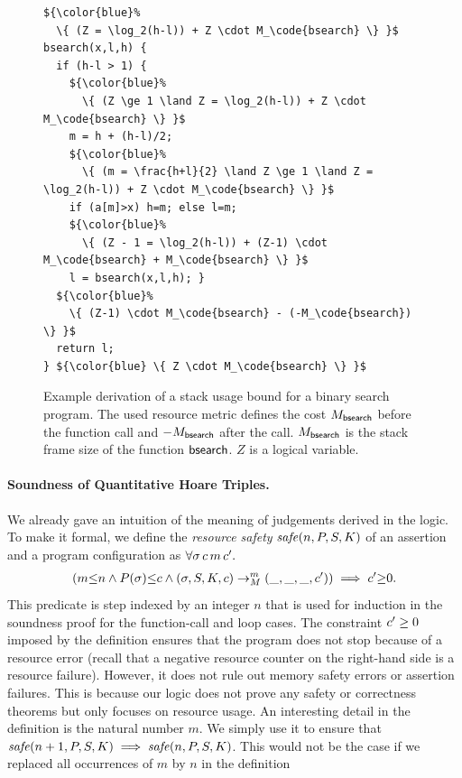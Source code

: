 \documentclass[nocopyrightspace,preprint,pldi]{sigplanconf-pldi15}
\newcommand{\iffull}[2]{\ifx\fullversion\undefined{#2}\else{#1}\fi}
\begin{document}
\begin{figure}
\begin{lstlisting}
${\color{blue}%
  \{ (Z = \log_2(h-l)) + Z \cdot M_\code{bsearch} \} }$
bsearch(x,l,h) {
  if (h-l > 1) {
    ${\color{blue}%
      \{ (Z \ge 1 \land Z = \log_2(h-l)) + Z \cdot M_\code{bsearch} \} }$
    m = h + (h-l)/2;
    ${\color{blue}%
      \{ (m = \frac{h+l}{2} \land Z \ge 1 \land Z = \log_2(h-l)) + Z \cdot M_\code{bsearch} \} }$
    if (a[m]>x) h=m; else l=m;
    ${\color{blue}%
      \{ (Z - 1 = \log_2(h-l)) + (Z-1) \cdot M_\code{bsearch} + M_\code{bsearch} \} }$
    l = bsearch(x,l,h); }
  ${\color{blue}%
    \{ (Z-1) \cdot M_\code{bsearch} - (-M_\code{bsearch}) \} }$
  return l;
} ${\color{blue} \{ Z \cdot M_\code{bsearch} \} }$
\end{lstlisting}
\caption{Example derivation of a stack usage bound for a binary
  search program.  The used resource metric defines the cost $M_{\mathsf{bsearch}}$ before
  the function call and $-M_{\mathsf{bsearch}}$ after the call.  $M_{\mathsf{bsearch}}$ is the stack
  frame size of the function $\mathsf{bsearch}$.  $Z$ is a
  logical variable.
  }
\label{fig:xmplbs}
\end{figure}


\paragraph{Soundness of Quantitative Hoare Triples.}

We already gave an intuition of the meaning of judgements
derived in the logic.  To make it formal, we define the
\emph{resource safety} $\mathit{safe}(n,P,S,K)$ of an assertion
and a program configuration as $\forall \sigma \, c \, m \, c' .$
\begin{align*}
  (m {\le} n \land P(\sigma) {\le} c \land
    (\sigma, S, K, c) \to_{M}^m (\_, \_, \_, c'))
  \implies c' {\ge} 0.
\end{align*}
This predicate is step indexed by an integer $n$ that is used for
induction in the soundness proof for the function-call and loop cases.
The constraint $c' \geq 0$ imposed by the definition ensures that
the program does not stop because of a resource error (recall that a
negative resource counter on the right-hand side is a resource
failure).  However, it does not rule out memory safety errors or
assertion failures. This is because our logic does not prove any
safety or correctness theorems but only focuses on resource usage.
%
An interesting detail in the definition is the natural number $m$.  We
simply use it to ensure that $\mathit{safe}(n+1,P,S,K) \implies \mathit{safe}(n,P,S,K) $.  This would not be the case if we replaced all occurrences of
$m$ by $n$ in the definition\iffull{ of validity.}{.}
\end{document}
